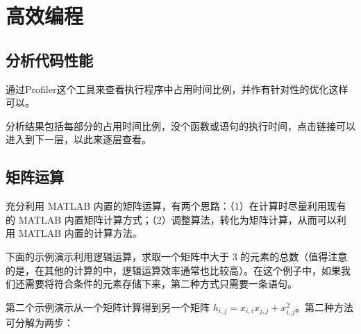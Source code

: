 \section{高效编程}

\subsection{分析代码性能}

通过Profiler这个工具来查看执行程序中占用时间比例，并作有针对性的优化这样可以。

\vspace{-0.8cm}


分析结果包括每部分的占用时间比例，没个函数或语句的执行时间，点击链接可以进入到下一层，以此来逐层查看。






\subsection{矩阵运算}

充分利用 MATLAB 内置的矩阵运算，有两个思路：（1）在计算时尽量利用现有的 MATLAB 内置矩阵计算方式；（2）调整算法，转化为矩阵计算，从而可以利用 MATLAB 内置的计算方法。\par

下面的示例演示利用逻辑运算，求取一个矩阵中大于 3 的元素的总数（值得注意的是，在其他的计算的中，逻辑运算效率通常也比较高）。在这个例子中，如果我们还需要将符合条件的元素存储下来，第二种方式只需要一条语句。

\vspace{-0.8cm}


\vspace{-0.8cm}


第二个示例演示从一个矩阵计算得到另一个矩阵 $h_{i,j} = x_{i,i}x_{j,j} + x_{i,j}^2$。第二种方法可分解为两步：

